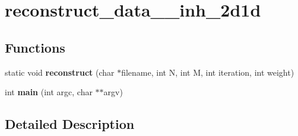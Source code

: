 \hypertarget{group__applications__mri2d__reconstruct__data__inh__2d1d}{\section{reconstruct\-\_\-data\-\_\-\-\_\-inh\-\_\-2d1d}
\label{group__applications__mri2d__reconstruct__data__inh__2d1d}
}
\subsection*{Functions}
\begin{DoxyCompactItemize}
\item 
\hypertarget{group__applications__mri2d__reconstruct__data__inh__2d1d_ga75582a0ebe96f1391e90db0053ee981c}{static void {\bfseries reconstruct} (char $\ast$filename, int N, int M, int iteration, int weight)}\label{group__applications__mri2d__reconstruct__data__inh__2d1d_ga75582a0ebe96f1391e90db0053ee981c}

\item 
\hypertarget{group__applications__mri2d__reconstruct__data__inh__2d1d_ga3c04138a5bfe5d72780bb7e82a18e627}{int {\bfseries main} (int argc, char $\ast$$\ast$argv)}\label{group__applications__mri2d__reconstruct__data__inh__2d1d_ga3c04138a5bfe5d72780bb7e82a18e627}

\end{DoxyCompactItemize}


\subsection{Detailed Description}
